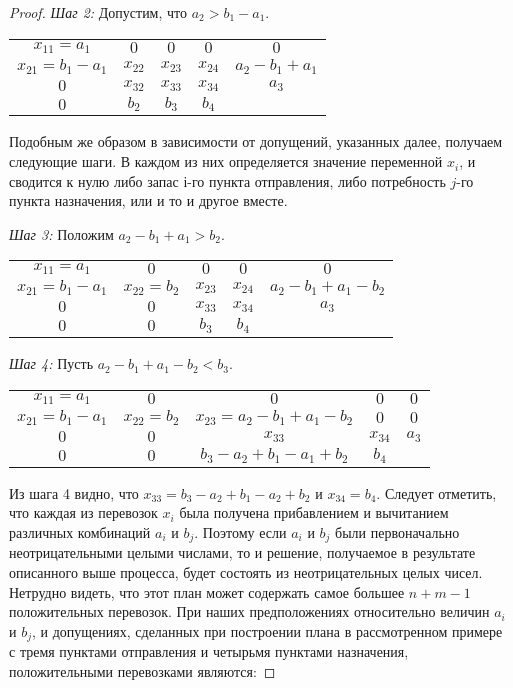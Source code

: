 \documentclass[a4paper,12pt]{article}
\begin{document}
\begin{proof}
		\textit{Шаг 2:} Допустим, что $a_2 > b_1 - a_1$.
		\begin{center}
			\begin{tabular}{cccc|c}
				$x_{11} = a_1$ & $0$ & $0$ & $0$ & $0$ \\
				$x_{21} = b_1 - a_1$ & $x_{22}$ & $x_{23}$ & $x_{24}$ & $a_2 - b_1 + a_1$ \\
				$0$ & $x_{32}$ & $x_{33}$ & $x_{34}$ & $a_3$ \\ \hline
				$0$ & $b_2$ & $b_3$ & $b_4$ & 
			\end{tabular}
		\end{center}
		
		Подобным же образом в зависимости от допущений, указанных далее, получаем следующие шаги. В каждом из них определяется значение переменной $x_i$, и сводится к нулю либо запас $і$-го пункта отправления, либо потребность $j$-го пункта назначения, или и то и другое вместе.
		
		\textit{Шаг 3:} Положим $a_2 - b_1 + a_1 > b_2$.
		\begin{center}
			\begin{tabular}{cccc|c}
				$x_{11} = a_1$ & $0$ & $0$ & $0$ & $0$ \\
				$x_{21} = b_1 - a_1$ & $x_{22} = b_2$ & $x_{23}$ & $x_{24}$ & $a_2 - b_1 + a_1 - b_2$ \\
				$0$ & $0$ & $x_{33}$ & $x_{34}$ & $a_3$ \\ \hline
				$0$ & $0$ & $b_3$ & $b_4$ & 
			\end{tabular}
		\end{center}
	
		\textit{Шаг 4:} Пусть $a_2 - b_1 + a_1 - b_2 < b_3$.
		\begin{center}
			\begin{tabular}{cccc|c}
				$x_{11} = a_1$ & $0$ & $0$ & $0$ & $0$ \\
				$x_{21} = b_1 - a_1$ & $x_{22} = b_2$ & $x_{23} = a_2 - b_1 + a_1 - b_2$ & $0$ & $0$ \\
				$0$ & $0$ & $x_{33}$ & $x_{34}$ & $a_3$ \\ \hline
				$0$ & $0$ & $b_3 - a_2 + b_1 - a_1 + b_2$ & $b_4$ & 
			\end{tabular}
		\end{center}
		
		Из шага 4 видно, что $x_{33} = b_3 - a_2 + b_1 - a_2 + b_2$ и $x_{34} = b_4$. Следует отметить, что каждая из перевозок $x_i$ была получена прибавлением и вычитанием различных комбинаций $a_i$ и $b_j$. Поэтому если  $a_i$ и $b_j$ были первоначально неотрицательными целыми числами, то и решение, получаемое в результате описанного выше процесса, будет состоять из неотрицательных целых чисел. Нетрудно видеть, что этот план может содержать самое большее $n + m - 1$ положительных перевозок. При наших предположениях относительно величин  $a_i$ и $b_j$, и допущениях, сделанных при построении плана в рассмотренном примере с тремя пунктами отправления и четырьмя пунктами назначения, положительными перевозками являются:
		

\end{proof}
\end{document}
